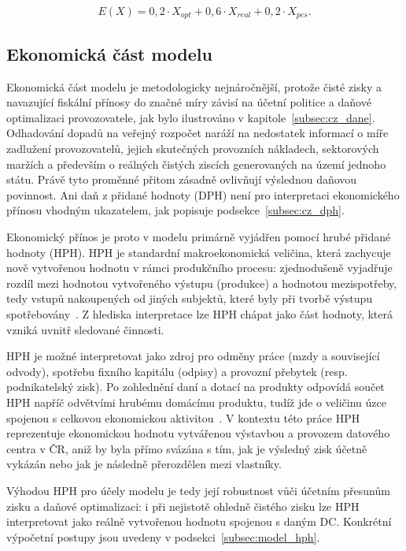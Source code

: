 $$E(X) = 0,2 \cdot X_{opt} + 0,6 \cdot X_{real} + 0,2 \cdot X_{pes}.$$

\subsection{Ekonomická část modelu}
\label{subsec:model_ekonomika}

Ekonomická část modelu je metodologicky nejnáročnější, protože čisté zisky a navazující fiskální přínosy do značné míry závisí na účetní politice a daňové optimalizaci provozovatele, jak bylo ilustrováno v kapitole~\ref{subsec:cz_dane}. Odhadování dopadů na veřejný rozpočet naráží na nedostatek informací o míře zadlužení provozovatelů, jejich skutečných provozních nákladech, sektorových maržích a především o reálných čistých ziscích generovaných na území jednoho státu. Právě tyto proměnné přitom zásadně ovlivňují výslednou daňovou povinnost. Ani daň z přidané hodnoty (DPH) není pro interpretaci ekonomického přínosu vhodným ukazatelem, jak popisuje podsekce~\ref{subsec:cz_dph}.

Ekonomický přínos je proto v modelu primárně vyjádřen pomocí hrubé přidané hodnoty (HPH). HPH je standardní makroekonomická veličina, která zachycuje nově vytvořenou hodnotu v rámci produkčního procesu: zjednodušeně vyjadřuje rozdíl mezi hodnotou vytvořeného výstupu (produkce) a hodnotou mezispotřeby, tedy vstupů nakoupených od jiných subjektů, které byly při tvorbě výstupu spotřebovány~\cite{oecd_oecd_2008}. Z hlediska interpretace lze HPH chápat jako část hodnoty, která vzniká uvnitř sledované činnosti.

HPH je možné interpretovat jako zdroj pro odměny práce (mzdy a související odvody), spotřebu fixního kapitálu (odpisy) a provozní přebytek (resp. podnikatelský zisk). Po zohlednění daní a dotací na produkty odpovídá součet HPH napříč odvětvími hrubému domácímu produktu, tudíž jde o veličinu úzce spojenou s celkovou ekonomickou aktivitou~\cite{csu_makroekonomicka_dvojcata_2024}. V kontextu této práce HPH reprezentuje ekonomickou hodnotu vytvářenou výstavbou a provozem datového centra v ČR, aniž by byla přímo svázána s tím, jak je výsledný zisk účetně vykázán nebo jak je následně přerozdělen mezi vlastníky.

Výhodou HPH pro účely modelu je tedy její robustnost vůči účetním přesunům zisku a daňové optimalizaci: i při nejistotě ohledně čistého zisku lze HPH interpretovat jako reálně vytvořenou hodnotu spojenou s daným DC. Konkrétní výpočetní postupy jsou uvedeny v podsekci~\ref{subsec:model_hph}.

